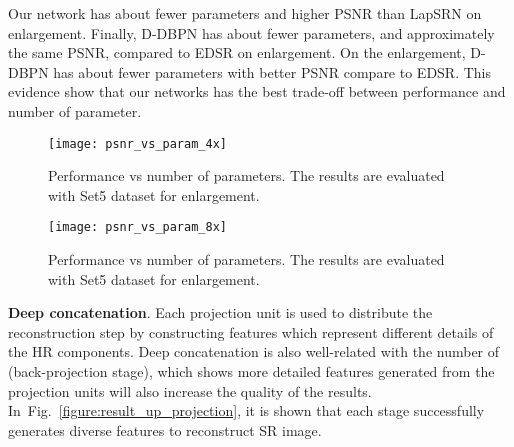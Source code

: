 \documentclass[10pt,twocolumn,letterpaper]{article}
\begin{document}
Our  network has about  fewer parameters and higher PSNR than LapSRN on  enlargement. 
Finally, D-DBPN has about  fewer parameters, and
approximately the same PSNR, compared to EDSR on  enlargement. On the  enlargement, D-DBPN has about  fewer parameters with better PSNR compare to EDSR. This evidence show that our networks has the best trade-off between performance and number of parameter.
\begin{figure}[t]
\centering
\texttt{[image: psnr\_vs\_param\_4x]}
\caption{Performance vs number of parameters. The results are evaluated with Set5 dataset for  enlargement.}
\label{figure:psnr_vs_param_4x}

\texttt{[image: psnr\_vs\_param\_8x]}
\caption{Performance vs number of parameters. The results are evaluated with Set5 dataset for  enlargement.}
\label{figure:psnr_vs_param_8x}
\end{figure} 

\begin{comment}
\begin{table}[h!]
\small
\caption{Performance (PSNR) of the DBPN-SS network and other networks on 4 and 8 enlargement. {\color{red}Red} indicates the best performance.}
\centering
\label{tab:filter_number}
\begin{tabular}{*1l*1c*1c*1c|*1c*1c}
\hline\noalign{\smallskip}
Algorithm & Scale &Depth&Parameter&Set5 &Set14 \\         
\noalign{\smallskip}\hline\noalign{\smallskip}
SRCNN~\cite{dong2016image}&4&3&57k			&&\\
FSRCNN~\cite{dong2016accelerating}&4&8&12k		&&\\
VDSR~\cite{Kim_2016_VDSR}&4&20&665k			&&\\
DBPN-SS&4&12&188k		&{\color{red}}&{\color{red}}\\
\noalign{\smallskip}\hline\noalign{\smallskip}
SRCNN~\cite{dong2016image}&8&3&57k			&&\\
FSRCNN~\cite{dong2016accelerating}&8&8&12k			&&\\
VDSR~\cite{Kim_2016_VDSR}&8&20&665k			&&\\
DBPN-SS&8&12&422k		&{\color{red}}&{\color{red}}\\
\noalign{\smallskip}\hline
\end{tabular}
\end{table}
\end{comment}



\textbf{Deep concatenation}. Each projection unit is used to
distribute the reconstruction step by constructing features
which represent different details of the HR components. Deep concatenation is also well-related with the number of  (back-projection stage), 
which shows more detailed features generated from the projection units will also increase the quality of the results. In~Fig.~\ref{figure:result_up_projection}, it is shown that each stage successfully generates diverse features to reconstruct SR image.
\end{document}
